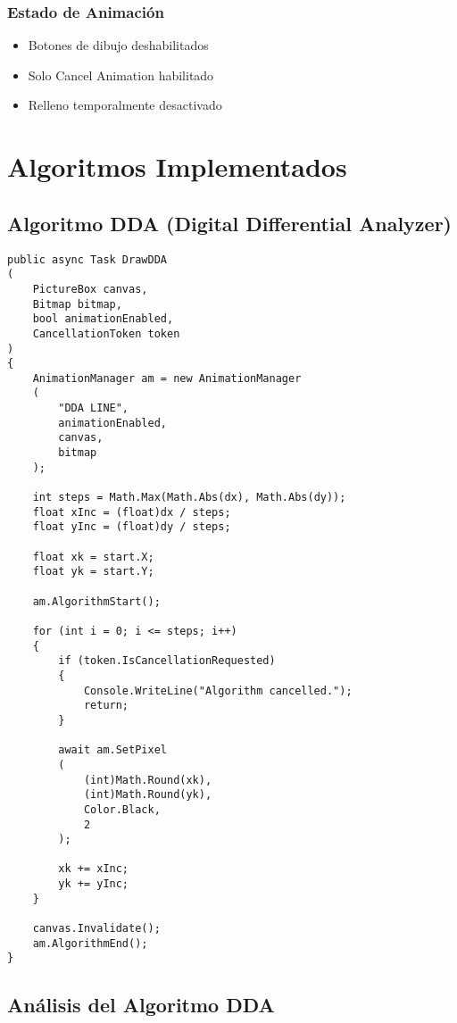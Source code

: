 \documentclass[12pt]{article}
\begin{document}
\subsubsection{Estado de Animación}
\begin{itemize}
    \item Botones de dibujo deshabilitados
    \item Solo Cancel Animation habilitado
    \item Relleno temporalmente desactivado
\end{itemize}

\section{Algoritmos Implementados}

\subsection{Algoritmo DDA (Digital Differential Analyzer)}
\begin{lstlisting}
public async Task DrawDDA
(
    PictureBox canvas,
    Bitmap bitmap,
    bool animationEnabled,
    CancellationToken token
)
{
    AnimationManager am = new AnimationManager
    (
        "DDA LINE",
        animationEnabled,
        canvas,
        bitmap
    );

    int steps = Math.Max(Math.Abs(dx), Math.Abs(dy));
    float xInc = (float)dx / steps;
    float yInc = (float)dy / steps;

    float xk = start.X;
    float yk = start.Y;

    am.AlgorithmStart();

    for (int i = 0; i <= steps; i++)
    {
        if (token.IsCancellationRequested)
        {
            Console.WriteLine("Algorithm cancelled.");
            return;
        }

        await am.SetPixel
        (
            (int)Math.Round(xk),
            (int)Math.Round(yk),
            Color.Black,
            2
        );

        xk += xInc;
        yk += yInc;
    }

    canvas.Invalidate();
    am.AlgorithmEnd();
}
\end{lstlisting}

\subsection{Análisis del Algoritmo DDA}
\end{document}
